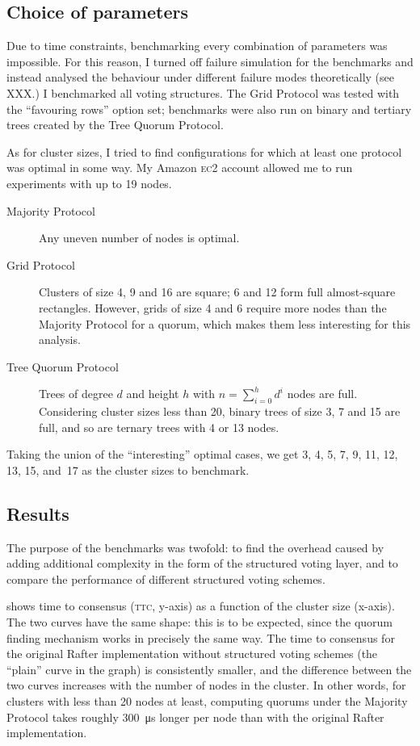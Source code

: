 \documentclass[11pt,chapterprefix=true,toc=bibliography,numbers=noendperiod,
               footnotes=multiple,twoside]{scrreprt}
\newcommand{\ECC}[0]{\textsc{ec}2 }
\begin{document}
\subsection{Choice of parameters}

Due to time constraints, benchmarking every combination of parameters was impossible. For this reason, I turned off failure simulation for the benchmarks and instead analysed the behaviour under different failure modes theoretically (see XXX.) I benchmarked all voting structures. The Grid Protocol was tested with the \enquote{favouring rows} option set; benchmarks were also run on binary and tertiary trees created by the Tree Quorum Protocol.

As for cluster sizes, I tried to find configurations for which at least one protocol was optimal in some way. My Amazon \ECC account allowed me to run experiments with up to 19 nodes.

\begin{description}
    \item[Majority Protocol] Any uneven number of nodes is optimal.
    \item[Grid Protocol] Clusters of size 4, 9 and 16 are square; 6 and 12 form full almost-square rectangles. However, grids of size 4 and 6 require more nodes than the Majority Protocol for a quorum, which makes them less interesting for this analysis.
    \item[Tree Quorum Protocol] Trees of degree \(d\) and height \(h\) with \(n = \sum^h_{i=0} d^i\) nodes are full. Considering cluster sizes less than 20, binary trees of size 3, 7 and 15 are full, and so are ternary trees with 4 or 13 nodes.
\end{description}

Taking the union of the \enquote{interesting} optimal cases, we get 3, 4, 5, 7, 9, 11, 12, 13, 15, and~17 as the cluster sizes to benchmark.

\subsection{Results}

The purpose of the benchmarks was twofold: to find the overhead caused by adding additional complexity in the form of the structured voting layer, and to compare the performance of different structured voting schemes.


 shows time to consensus (\textsc{ttc}, y-axis) as a function of the cluster size (x-axis). The two curves have the same shape: this is to be expected, since the quorum finding mechanism works in precisely the same way. The time to consensus for the original Rafter implementation without structured voting schemes (the \enquote{plain} curve in the graph) is consistently smaller, and the difference between the two curves increases with the number of nodes in the cluster. In other words, for clusters with less than 20 nodes at least, computing quorums under the Majority Protocol takes roughly \SI{300}{\micro\second} longer per node than with the original Rafter implementation.
\end{document}
